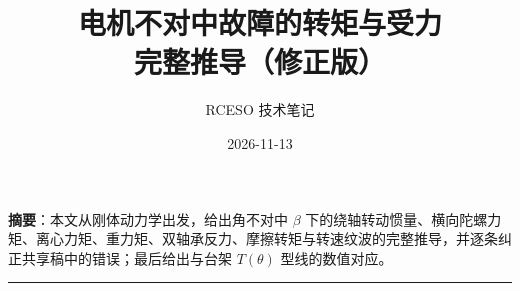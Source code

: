 \documentclass[11pt,a4paper]{ctexart}
\title{电机不对中故障的转矩与受力\\[2pt]\large 完整推导（修正版）}
\author{RCESO 技术笔记}
\date{2026-11-13}
\begin{document}
\maketitle
\noindent\textbf{摘要}：本文从刚体动力学出发，给出角不对中 $\beta$ 下的绕轴转动惯量、横向陀螺力矩、离心力矩、重力矩、双轴承反力、摩擦转矩与转速纹波的完整推导，并逐条纠正共享稿中的错误；最后给出与台架 $T(\theta)$ 型线的数值对应。
\vspace{4pt}\hrule\vspace{6pt}


\end{document}
